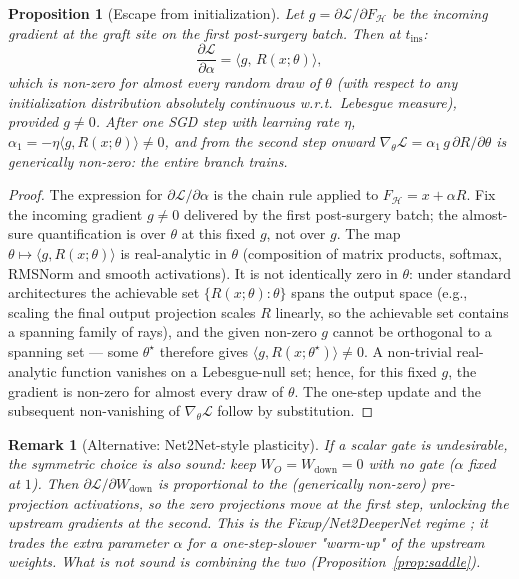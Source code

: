 \documentclass[11pt,a4paper]{article}
\newtheorem{proposition}{Proposition}
\newtheorem{remark}{Remark}
\newcommand{\Hb}{\mathcal{H}}
\newcommand{\Loss}{\mathcal{L}}
\begin{document}
\begin{proposition}[Escape from initialization]
\label{prop:escape}
Let $g = \partial \Loss / \partial F_{\Hb}$ be the incoming gradient at the graft site on the first post-surgery batch. Then at $t_{\mathrm{ins}}$:
\[
\frac{\partial \Loss}{\partial \alpha} = \langle g,\, R(x;\theta) \rangle,
\]
which is non-zero for almost every random draw of $\theta$ (with respect to any initialization distribution absolutely continuous w.r.t.\ Lebesgue measure), provided $g \neq 0$. After one SGD step with learning rate $\eta$, $\alpha_1 = -\eta \langle g, R(x;\theta)\rangle \neq 0$, and from the second step onward $\nabla_\theta \Loss = \alpha_1 \, g \, \partial R / \partial \theta$ is generically non-zero: the entire branch trains.
\end{proposition}

\begin{proof}
The expression for $\partial \Loss / \partial \alpha$ is the chain rule applied to $F_{\Hb} = x + \alpha R$. Fix the incoming gradient $g \neq 0$ delivered by the first post-surgery batch; the almost-sure quantification is over $\theta$ at this fixed $g$, not over $g$. The map $\theta \mapsto \langle g, R(x;\theta) \rangle$ is real-analytic in $\theta$ (composition of matrix products, softmax, RMSNorm and smooth activations). It is not identically zero in $\theta$: under standard architectures the achievable set $\{R(x;\theta) : \theta\}$ spans the output space (e.g., scaling the final output projection scales $R$ linearly, so the achievable set contains a spanning family of rays), and the given non-zero $g$ cannot be orthogonal to a spanning set --- some $\theta^\star$ therefore gives $\langle g, R(x;\theta^\star)\rangle \neq 0$. A non-trivial real-analytic function vanishes on a Lebesgue-null set; hence, for this fixed $g$, the gradient is non-zero for almost every draw of $\theta$. The one-step update and the subsequent non-vanishing of $\nabla_\theta \Loss$ follow by substitution.
\end{proof}

\begin{remark}[Alternative: Net2Net-style plasticity]
\label{rem:net2net-alt}
If a scalar gate is undesirable, the symmetric choice is also sound: keep $W_O = W_{\mathrm{down}} = 0$ with \emph{no} gate ($\alpha$ fixed at $1$). Then $\partial \Loss / \partial W_{\mathrm{down}}$ is proportional to the (generically non-zero) pre-projection activations, so the zero projections move at the first step, unlocking the upstream gradients at the second. This is the Fixup/Net2DeeperNet regime \cite{fixup, net2net}; it trades the extra parameter $\alpha$ for a one-step-slower "warm-up" of the upstream weights. What is \emph{not} sound is combining the two (Proposition~\ref{prop:saddle}).
\end{remark}
\end{document}
